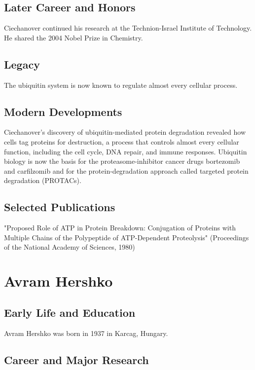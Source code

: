 \subsection*{Later Career and Honors}

Ciechanover continued his research at the Technion-Israel Institute of Technology. He shared the 2004 Nobel Prize in Chemistry.

\subsection*{Legacy}

The ubiquitin system is now known to regulate almost every cellular process.

\subsection*{Modern Developments}

Ciechanover's discovery of ubiquitin-mediated protein degradation revealed how cells tag proteins for destruction, a process that controls almost every cellular function, including the cell cycle, DNA repair, and immune responses. Ubiquitin biology is now the basis for the proteasome-inhibitor cancer drugs bortezomib and carfilzomib and for the protein-degradation approach called targeted protein degradation (PROTACs).

\subsection*{Selected Publications}

"Proposed Role of ATP in Protein Breakdown: Conjugation of Proteins with Multiple Chains of the Polypeptide of ATP-Dependent Proteolysis" (Proceedings of the National Academy of Sciences, 1980)

\clearpage

\section{Avram Hershko}

\subsection*{Early Life and Education}

Avram Hershko was born in 1937 in Karcag, Hungary.

\subsection*{Career and Major Research}

